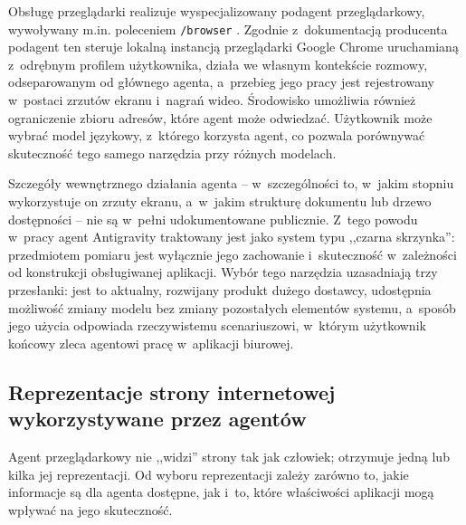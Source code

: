 Obsługę przeglądarki realizuje wyspecjalizowany podagent przeglądarkowy, wywoływany m.in. poleceniem \texttt{/browser} \citep{google2025antigravitydocs}. Zgodnie z~dokumentacją producenta podagent ten steruje lokalną instancją przeglądarki Google Chrome uruchamianą z~odrębnym profilem użytkownika, działa we własnym kontekście rozmowy, odseparowanym od głównego agenta, a~przebieg jego pracy jest rejestrowany w~postaci zrzutów ekranu i~nagrań wideo. Środowisko umożliwia również ograniczenie zbioru adresów, które agent może odwiedzać. Użytkownik może wybrać model językowy, z~którego korzysta agent, co pozwala porównywać skuteczność tego samego narzędzia przy różnych modelach.

Szczegóły wewnętrznego działania agenta -- w~szczególności to, w~jakim stopniu wykorzystuje on zrzuty ekranu, a~w~jakim strukturę dokumentu lub drzewo dostępności -- nie są w~pełni udokumentowane publicznie. Z~tego powodu w~pracy agent Antigravity traktowany jest jako system typu ,,czarna skrzynka'': przedmiotem pomiaru jest wyłącznie jego zachowanie i~skuteczność w~zależności od konstrukcji obsługiwanej aplikacji. Wybór tego narzędzia uzasadniają trzy przesłanki: jest to aktualny, rozwijany produkt dużego dostawcy, udostępnia możliwość zmiany modelu bez zmiany pozostałych elementów systemu, a~sposób jego użycia odpowiada rzeczywistemu scenariuszowi, w~którym użytkownik końcowy zleca agentowi pracę w~aplikacji biurowej.

\subsection{Reprezentacje strony internetowej wykorzystywane przez agentów}
\label{sec:reprezentacje}
Agent przeglądarkowy nie ,,widzi'' strony tak jak człowiek; otrzymuje jedną lub kilka jej reprezentacji. Od wyboru reprezentacji zależy zarówno to, jakie informacje są dla agenta dostępne, jak i~to, które właściwości aplikacji mogą wpływać na jego skuteczność.

